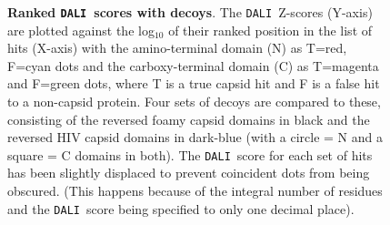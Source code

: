 \documentclass[12pt]{article}
\newcommand{\3}{$3_{10}$}
\newcommand{\DALI}{{\tt DALI}}
\begin{document}
\begin{figure}
\centering
{}
\begin{footnotesize}
\caption{
\label{Fig:revs}
{\bf Ranked \DALI\ scores with decoys}.
The \DALI\ Z-scores (Y-axis) are plotted against the log$_{10}$ of their ranked position in the 
list of hits (X-axis) with the amino-terminal domain (N) as T=red, F=cyan dots and the carboxy-terminal domain (C)
as T=magenta and F=green dots, where T is a true capsid hit and F is a false hit to a non-capsid protein.
Four sets of decoys are compared to these, consisting of the reversed foamy capsid domains in
black and the reversed HIV capsid domains in dark-blue (with a circle = N and a square = C domains in both).
The \DALI\ score for each set of hits has been slightly displaced to prevent coincident dots from being
obscured.  (This happens because of the integral number of residues and the \DALI\ score being specified
to only one decimal place).
}
\end{footnotesize}
\end{figure}
\end{document}
